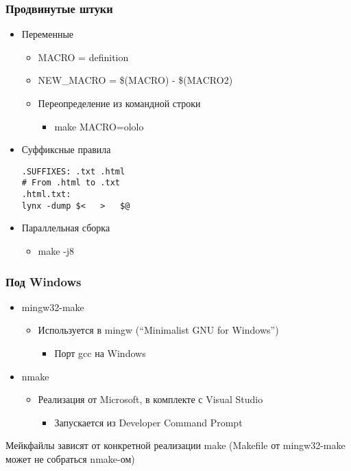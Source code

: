 \documentclass{../../slides-style}
\begin{document}
    \begin{frame}[fragile]
        \frametitle{Продвинутые штуки}
        \begin{itemize}
            \item Переменные
            \begin{itemize}
                \item MACRO = definition
                \item NEW\_MACRO = \$(MACRO) - \$(MACRO2)
                \item Переопределение из командной строки
                \begin{itemize}
                    \item make MACRO=ololo
                \end{itemize}
            \end{itemize}
            \item Суффиксные правила
            \begin{footnotesize}
                \begin{verbatim}
.SUFFIXES: .txt .html
# From .html to .txt
.html.txt:
lynx -dump $<   >   $@
                \end{verbatim}
            \end{footnotesize}
            \item Параллельная сборка
            \begin{itemize}
                \item make -j8
            \end{itemize}
        \end{itemize}
    \end{frame}

    \begin{frame}
        \frametitle{Под Windows}
        \begin{itemize}
            \item mingw32-make
            \begin{itemize}
                \item Используется в mingw (``Minimalist GNU for Windows'')
                \begin{itemize}
                    \item Порт gcc на Windows
                \end{itemize}
            \end{itemize}
            \item nmake
            \begin{itemize}
                \item Реализация от Microsoft, в комплекте с Visual Studio
                \begin{itemize}
                    \item Запускается из Developer Command Prompt
                \end{itemize}
            \end{itemize}
        \end{itemize}
        Мейкфайлы зависят от конкретной реализации make (Makefile от mingw32-make может не собраться nmake-ом)
    \end{frame}
\end{document}
